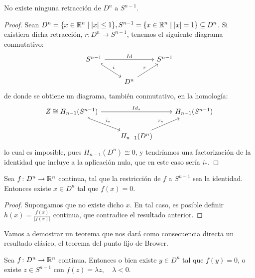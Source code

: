 \begin{lemma}
  No existe ninguna retracción de $D^n$ a $S^{n-1}$.
\end{lemma}

\begin{proof}
  Sean $D^n = \{x \in \mathbb{R}^n \mid |x| \leq 1\}, S^{n-1} = \{x \in \mathbb{R}^n \mid |x| = 1\} \subseteq D^n$. Si existiera dicha retracción,
  $r \colon D^n \to S^{n-1}$, tenemos el siguiente diagrama conmutativo:
  \[ \begin{tikzcd}
    S^{n-1} \arrow[hookrightarrow]{dr}{i} \arrow{rr}{Id} & & S^{n-1} \\
    & D^n \arrow{ur}{r}
  \end{tikzcd} \]
  de donde se obtiene un diagrama, también conmutativo, en la homología:
  \[ \begin{tikzcd}
    Z \cong H_{n-1}(S^{n-1}) \arrow[hookrightarrow]{dr}{i_*} \arrow{rr}{Id_*} & & H_{n-1}(S^{n-1}) \\
    & H_{n-1}(D^n) \arrow{ur}{r_*}
  \end{tikzcd} \]
  lo cual es imposible, pues $H_{n-1}(D^n) \cong 0$, y tendríamos una factorización de la identidad que incluye a la aplicación nula,
  que en este caso sería $i_*$.
\end{proof}

\begin{corollary}
  Sea $f \colon D^n \to \mathbb{R}^n$ continua, tal que la restricción de $f$ a $S^{n-1}$ sea la identidad.
  Entonces existe $x \in D^n$ tal que $f(x) = 0$.
\end{corollary}

\begin{proof}
  Supongamos que no existe dicho $x$. En tal caso, es posible definir $h(x) = \frac{f(x)}{|f(x)|}$
  continua, que contradice el resultado anterior.
\end{proof}

Vamos a demostrar un teorema que nos dará como consecuencia directa un resultado clásico, el teorema
del punto fijo de Brower.

\begin{theorem}
  Sea $f \colon D^n \to \mathbb{R}^n$ continua. Entonces o bien existe $y \in D^n$ tal que $f(y) = 0$, o existe
  $z \in S^{n-1}$ con $f(z) = \lambda z, \quad \lambda < 0$.
\end{theorem}

